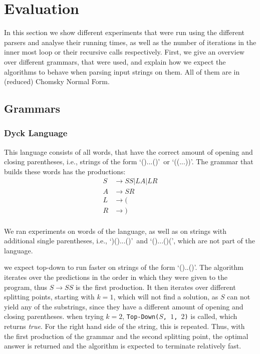 \section{Evaluation}
\label{sec:Evaluation}
In this section we show different experiments that were run using the different parsers and analyse their running times, as well as the number of iterations in the inner most loop or their recursive calls respectively.
First, we give an overview over different grammars, that were used, and explain how we expect the algorithms to behave when parsing input strings on them.
All of them are in (reduced) Chomsky Normal Form.

\subsection{Grammars}
\subsubsection{Dyck Language}
This language consists of all words, that have the correct amount of opening and closing parentheses, i.e., strings of the form \lq()...()\rq~or \lq((...))\rq.
The grammar that builds these words has the productions:
\begin{align*}
    S&\rightarrow SS|LA|LR\\
    A&\rightarrow SR\\
    L&\rightarrow (\\
    R&\rightarrow )\\
\end{align*}

We ran experiments on words of the language, as well as on strings with additional single parentheses, i.e., \lq)()...()\rq~and \lq()...()(\rq, which are not part of the language.

we expect top-down to run faster on strings of the form \lq ()..()\rq.
The algorithm iterates over the predictions in the order in which they were given to the program, thus $S\rightarrow SS$ is the first production.
It then iterates over different splitting points, starting with $k=1$, which will not find a solution, as $S$ can not yield any of the substrings, since they have a different amount of opening and closing parentheses.
when trying $k=2$, \texttt{Top-Down($S$, $1$, $2$)} is called, which returns \textit{true}.
For the right hand side of the string, this is repeated.
Thus, with the first production of the grammar and the second splitting point, the optimal answer is returned and the algorithm is expected to terminate relatively fast.


